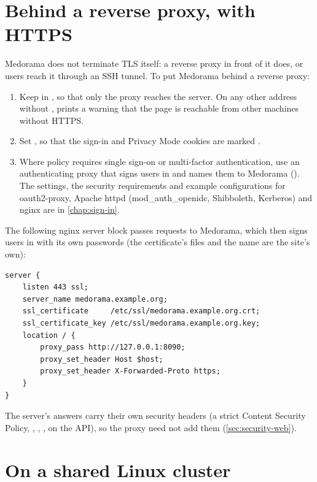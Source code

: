 \section{Behind a reverse proxy, with HTTPS}
\label{sec:deployment-proxy}

Medorama does not terminate TLS itself: a reverse proxy in front of it does, or users reach it
through an SSH tunnel. To put Medorama behind a reverse proxy:
\begin{enumerate}
\item Keep  in , so that only the proxy reaches the
  server. On any other address without ,  prints a
  warning that the page is reachable from other machines without HTTPS.
\item Set , so that the sign-in and Privacy Mode cookies are
  marked .
\item Where policy requires single sign-on or multi-factor authentication, use an
  authenticating proxy that signs users in and names them to Medorama
  (). The settings, the security requirements and example
  configurations for oauth2-proxy, Apache httpd (mod\_auth\_openidc, Shibboleth, Kerberos) and
  nginx are in \cref{chap:sign-in}.
\end{enumerate}
The following nginx server block passes requests to Medorama, which then signs users in with its
own passwords (the certificate's files and the name are the site's own):
\begin{lstlisting}[style=text]
server {
    listen 443 ssl;
    server_name medorama.example.org;
    ssl_certificate     /etc/ssl/medorama.example.org.crt;
    ssl_certificate_key /etc/ssl/medorama.example.org.key;
    location / {
        proxy_pass http://127.0.0.1:8090;
        proxy_set_header Host $host;
        proxy_set_header X-Forwarded-Proto https;
    }
}
\end{lstlisting}
The server's answers carry their own security headers (a strict Content Security Policy,
, , ,  on the API), so the proxy need not add them
(\cref{sec:security-web}).

\section{On a shared Linux cluster}
\label{sec:deployment-cluster}

